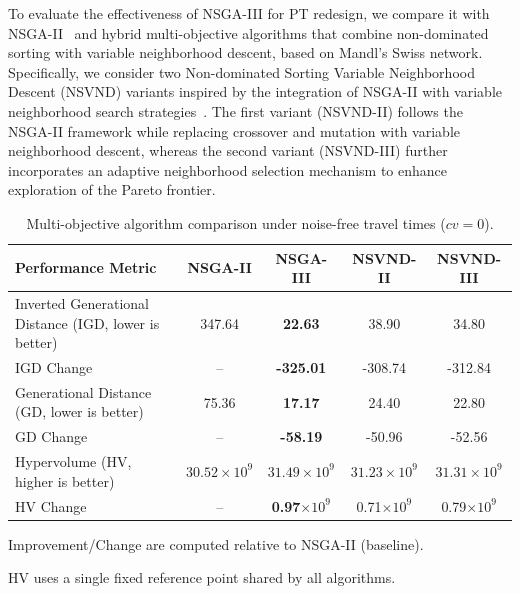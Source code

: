 \documentclass[a4paper,fleqn]{cas-sc}
\begin{document}
To evaluate the effectiveness of NSGA-III for  PT redesign, we compare it with NSGA-II~\citep{deb2002fast} and hybrid multi-objective algorithms that combine non-dominated sorting with variable neighborhood descent, based on Mandl’s Swiss network.
Specifically, we consider two Non-dominated Sorting Variable Neighborhood Descent (NSVND) variants inspired by the integration of NSGA-II with variable neighborhood search strategies~\citep{hansen2001variable}.
The first variant (NSVND-II) follows the NSGA-II framework while replacing crossover and mutation with variable neighborhood descent, whereas the second variant (NSVND-III) further incorporates an adaptive neighborhood selection mechanism to enhance exploration of the Pareto frontier.

\begin{table}[htbp]
\centering
\footnotesize
\setlength{\tabcolsep}{4.5pt}
\renewcommand{\arraystretch}{1.15}
\begin{threeparttable}
\begin{tabular}{@{}l*{4}{c}@{}}
\toprule
\textbf{Performance Metric} & \textbf{NSGA-II} & \textbf{NSGA-III} & \textbf{NSVND-II} & \textbf{NSVND-III} \\
\midrule
Inverted Generational Distance (IGD, lower is better) 
& 347.64 
& \textbf{22.63} 
& 38.90 
& 34.80 \\
IGD Change\tnote{a} 
& -- 
& \textbf{-325.01} 
& -308.74 
& -312.84 \\
\midrule
Generational Distance (GD, lower is better) 
& 75.36 
& \textbf{17.17} 
& 24.40 
& 22.80 \\
GD Change\tnote{a} 
& -- 
& \textbf{-58.19} 
& -50.96 
& -52.56 \\
\midrule
Hypervolume (HV, higher is better) \tnote{b} 
& $30.52\times10^9$ 
& \textbf{$31.49\times10^9$} 
& $31.23\times10^9$ 
& $31.31\times10^9$ \\
HV Change\tnote{a} 
& -- 
& \textbf{0.97$\times10^9$} 
& 0.71$\times10^9$ 
& 0.79$\times10^9$ \\
\bottomrule
\end{tabular}

\begin{tablenotes}\footnotesize
\item[a] Improvement/Change are computed relative to NSGA-II (baseline).
\item[b] HV uses a single fixed reference point shared by all algorithms.
\end{tablenotes}
\end{threeparttable}
\caption{Multi-objective algorithm comparison under noise-free travel times ($cv=0$).}
\label{tab:algorithm_comparison_simple}
\end{table}
\end{document}
